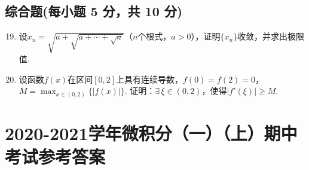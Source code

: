 \documentclass[../Main.tex]{subfiles}
\begin{document}
\section{综合题(每小题 5 分，共 10 分)}
\begin{enumerate}
    \setcounter{enumi}{18}
    \item 设$x_{n}=\sqrt{a+\sqrt{a+\cdots+\sqrt{a}}}$（$n$个根式，$a>0$），证明$\{
              x_{n}\}$收敛，并求出极限值.
          \vspace{18em}

    \item 设函数$f(x)$在区间$[0,2]$上具有连续导数，$f(0)=f(2)=0$，$M=\max_{x\in(0,2)}
              \{|f(x)|\}$. 证明：$\exists\,\xi\in(0,2)$，使得$|f'(\xi)|\geq M$.
\end{enumerate}

\chapter{2020-2021学年微积分（一）（上）期中考试参考答案}
\end{document}

